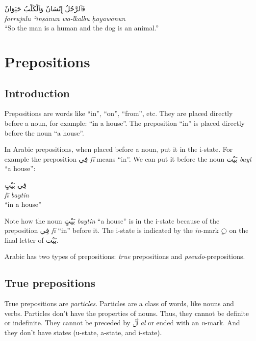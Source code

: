 \documentclass[
  10pt,
]{book}
\begin{document}
\foreignlanguage{arabic}{فَٱلرَّجُلُ إِنْسَانٌ وَٱلْکَلْبُ حَيَوَانٌ}\\
\emph{farrujulu ʾinṣānun wa-lkalbu ḥayawānun}\\
\enquote{So the man is a human and the dog is an animal.}

\chapter{Prepositions}\label{prepositions}

\section{Introduction}\label{introduction-3}

Prepositions are words like \enquote{in}, \enquote{on}, \enquote{from}, etc. They are placed directly before a noun, for example: \enquote{in a house}. The preposition \enquote{in} is placed directly before the noun \enquote{a house}.

In Arabic prepositions, when placed before a noun, put it in the i-state. For example the preposition \foreignlanguage{arabic}{فِي} \emph{fī} means \enquote{in}. We can put it before the noun \foreignlanguage{arabic}{بَيْت} \emph{bayt} \enquote{a house}:

\foreignlanguage{arabic}{فِي بَيْتٍ}\\
\emph{fī baytin}\\
\enquote{in a house}

Note how the noun \foreignlanguage{arabic}{بَيْتٍ} \emph{baytin} \enquote{a house} is in the i-state because of the preposition \foreignlanguage{arabic}{فِي} \emph{fī} \enquote{in} before it. The i-state is indicated by the \emph{in}-mark \foreignlanguage{arabic}{◌ٍ} on the final letter of \foreignlanguage{arabic}{بَيْت}.

Arabic has two types of prepositions: \emph{true} prepositions and \emph{pseudo}-prepositions.

\section{True prepositions}\label{true-prepositions}

True prepositions are \emph{particles}. Particles are a class of words, like nouns and verbs. Particles don't have the properties of nouns. Thus, they cannot be definite or indefinite. They cannot be preceded by \foreignlanguage{arabic}{ٱَلْ} \emph{al} or ended with an \emph{n}-mark. And they don't have states (u-state, a-state, and i-state).
\end{document}
